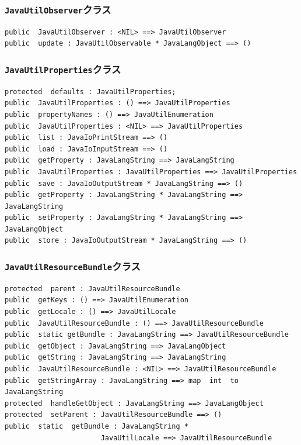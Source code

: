 \documentclass[\pformat,12pt]{jarticle}
\begin{document}
\subsubsection{\texttt{JavaUtilObserver}クラス}
\begin{small}
\begin{verbatim}
public  JavaUtilObserver : <NIL> ==> JavaUtilObserver
public  update : JavaUtilObservable * JavaLangObject ==> ()
\end{verbatim}
\end{small}

\subsubsection{\texttt{JavaUtilProperties}クラス}
\begin{small}
\begin{verbatim}
protected  defaults : JavaUtilProperties;
public  JavaUtilProperties : () ==> JavaUtilProperties
public  propertyNames : () ==> JavaUtilEnumeration
public  JavaUtilProperties : <NIL> ==> JavaUtilProperties
public  list : JavaIoPrintStream ==> ()
public  load : JavaIoInputStream ==> ()
public  getProperty : JavaLangString ==> JavaLangString
public  JavaUtilProperties : JavaUtilProperties ==> JavaUtilProperties
public  save : JavaIoOutputStream * JavaLangString ==> ()
public  getProperty : JavaLangString * JavaLangString ==> JavaLangString
public  setProperty : JavaLangString * JavaLangString ==> JavaLangObject
public  store : JavaIoOutputStream * JavaLangString ==> ()
\end{verbatim}
\end{small}

\subsubsection{\texttt{JavaUtilResourceBundle}クラス}
\begin{small}
\begin{verbatim}
protected  parent : JavaUtilResourceBundle
public  getKeys : () ==> JavaUtilEnumeration
public  getLocale : () ==> JavaUtilLocale
public  JavaUtilResourceBundle : () ==> JavaUtilResourceBundle
public  static getBundle : JavaLangString ==> JavaUtilResourceBundle
public  getObject : JavaLangString ==> JavaLangObject
public  getString : JavaLangString ==> JavaLangString
public  JavaUtilResourceBundle : <NIL> ==> JavaUtilResourceBundle
public  getStringArray : JavaLangString ==> map  int  to  JavaLangString
protected  handleGetObject : JavaLangString ==> JavaLangObject
protected  setParent : JavaUtilResourceBundle ==> ()
public  static  getBundle : JavaLangString * 
                       JavaUtilLocale ==> JavaUtilResourceBundle
\end{verbatim}
\end{small}
\end{document}
